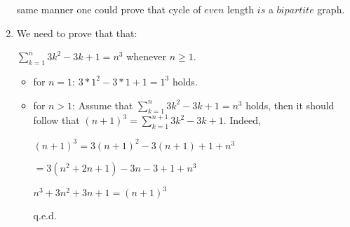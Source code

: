 \documentclass[12pt]{article}
\begin{document}
\begin{enumerate}
    same manner one could prove that cycle of $even$ length $is$ a $bipartite$ graph.
  \item
    We need to prove that that: \newline
    \centerline{$\sum\limits_{k = 1}^{n} 3k^2-3k+1 = n^3$ whenever $n \geq 1$.}
    \newline
    \begin{itemize}
      \item
        for $n = 1$: $3*1^2 - 3*1 + 1 = 1^3$ holds.
      \item
        for $n > 1$: \newline
        Assume that $\sum\limits_{k = 1}^{n} 3k^2-3k+1 = n^3$ holds,
        \newline
        then it should follow that $(n+1)^3 = \sum\limits_{k = 1}^{n+1} 3k^2-3k+1$.
        \newline
        Indeed, \newline
        \centerline{$(n+1)^3 = 3(n+1)^2 - 3(n+1) + 1 + n^3$} \newline
        \centerline{$ = 3(n^2+2n+1) - 3n - 3 + 1 + n^3$} \newline
        \centerline{$n^3+3n^2+3n+1 = (n+1)^3$} q.e.d.
    \end{itemize}
\end{enumerate}
\end{document}

